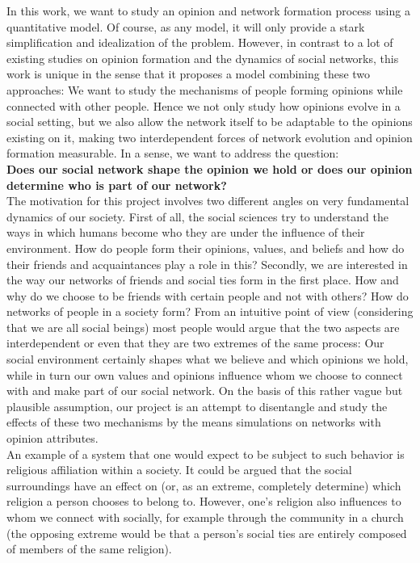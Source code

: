 \documentclass[11pt]{article}
\begin{document}
In this work, we want to study an opinion and network formation process using a quantitative model. Of course, as any model, it will only provide a stark simplification and idealization of the problem. However, in contrast to a lot of existing studies on opinion formation and the dynamics of social networks, this work is unique in the sense that it proposes a model combining these two approaches: We want to study the mechanisms of people forming opinions while connected with other people. Hence we not only study how opinions evolve in a social setting, but we also allow the network itself to be adaptable to the opinions existing on it, making two interdependent forces of network evolution and opinion formation measurable. In a sense, we want to address the question: \\


\textbf{Does our social network shape the opinion we hold or does our opinion determine who is part of our network?} \\


The motivation for this project involves two different angles on very fundamental dynamics of our society. First of all, the social sciences try to understand the ways in which humans become who they are under the influence of their environment. How do people form their opinions, values, and beliefs and how do their friends and acquaintances play a role in this? Secondly, we are interested in the way our networks of friends and social ties form in the first place. How and why do we choose to be friends with certain people and not with others? How do networks of people in a society form?
From an intuitive point of view (considering that we are all social beings) most people would argue that the two aspects are interdependent or even that they are two extremes of the same process: Our social environment certainly shapes what we believe and which opinions we hold, while in turn our own values and opinions influence whom we choose to connect with and make part of our social network. On the basis of this rather vague but plausible assumption, our project is an attempt to disentangle and study the effects of these two mechanisms by the means simulations on networks with opinion attributes. \\


An example of a system that one would expect to be subject to such behavior is religious affiliation within a society. It could be argued that the social surroundings have an effect on (or, as an extreme, completely determine) which religion a person chooses to belong to. However, one's religion also influences to whom we connect with socially, for example through the community in a church (the opposing extreme would be that a person's social ties are entirely composed of members of the same religion). 
\end{document}
